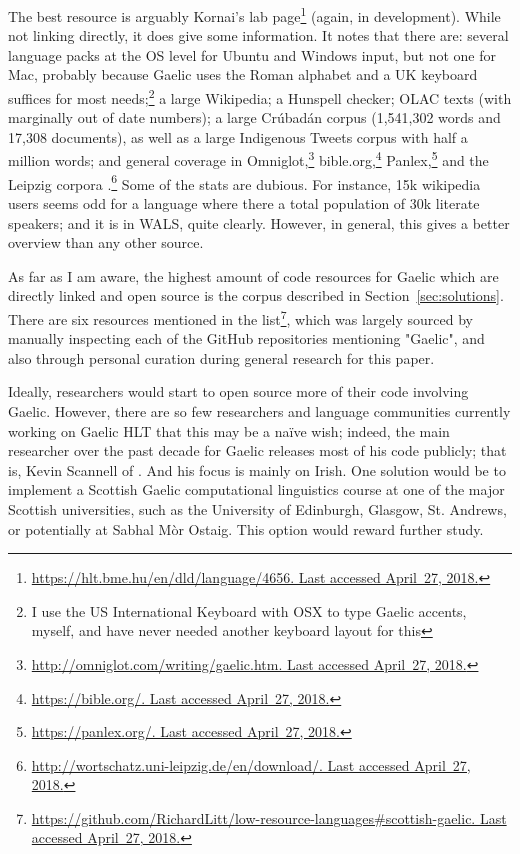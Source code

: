 The best resource is arguably Kornai's lab page\footnote{\href{https://hlt.bme.hu/en/dld/language/4656}{https://hlt.bme.hu/en/dld/language/4656. Last accessed April~27, 2018.}} (again, in development). While not linking directly, it does give some information. It notes that there are: several language packs at the OS level for Ubuntu and Windows input, but not one for Mac, probably because Gaelic uses the Roman alphabet and a UK keyboard suffices for most needs;\footnote{I use the US International Keyboard with OSX to type Gaelic accents, myself, and have never needed another keyboard layout for this} a large Wikipedia; a Hunspell checker; OLAC texts (with marginally out of date numbers); a large Cr\'ubad\'an corpus (1,541,302 words and 17,308 documents), as well as a large Indigenous Tweets corpus with half a million words; and general coverage in Omniglot,\footnote{\href{http://omniglot.com/writing/gaelic.htm}{http://omniglot.com/writing/gaelic.htm. Last accessed April~27, 2018.}} bible.org,\footnote{\href{https://bible.org/}{https://bible.org/. Last accessed April~27, 2018.}} Panlex,\footnote{\href{https://panlex.org/}{https://panlex.org/. Last accessed April~27, 2018.}} and the Leipzig corpora \citep{goldhahn2012building}.\footnote{\href{http://wortschatz.uni-leipzig.de/en/download/}{http://wortschatz.uni-leipzig.de/en/download/. Last accessed April~27, 2018.}} Some of the stats are dubious. For instance, 15k wikipedia users seems odd for a language where there a total population of 30k literate speakers; and it is in WALS, quite clearly. However, in general, this gives a better overview than any other source. 

As far as I am aware, the highest amount of code resources for Gaelic which are directly linked and open source is the corpus described in Section~\ref{sec:solutions}. There are six resources mentioned in the list\footnote{\href{https://github.com/RichardLitt/low-resource-languages\#scottish-gaelic}{https://github.com/RichardLitt/low-resource-languages\#scottish-gaelic. Last accessed April~27, 2018.}}, which was largely sourced by manually inspecting each of the GitHub repositories mentioning "Gaelic", and also through personal curation during general research for this paper. 

Ideally, researchers would start to open source more of their code involving Gaelic. However, there are so few researchers and language communities currently working on Gaelic HLT that this may be a na\"{i}ve wish; indeed, the main researcher over the past decade for Gaelic releases most of his code publicly; that is, Kevin Scannell of \citet{scannell2007crubadan}. And his focus is mainly on Irish. One solution would be to implement a Scottish Gaelic computational linguistics course at one of the major Scottish universities, such as the University of Edinburgh, Glasgow, St. Andrews, or potentially at Sabhal M\`or Ostaig. This option would reward further study. 

